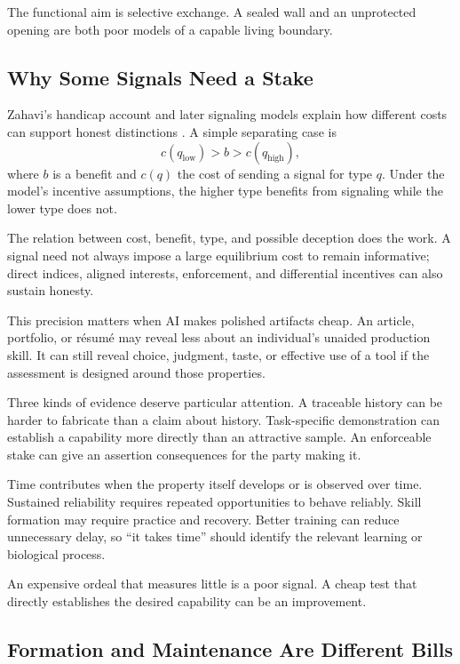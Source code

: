 \documentclass[11pt,openany]{book}
\begin{document}
The functional aim is selective exchange. A sealed wall and an unprotected opening are both poor models of a capable living boundary.

\subsection{Why Some Signals Need a Stake}

Zahavi's handicap account and later signaling models explain how different costs can support honest distinctions \cite{zahavi1975mate,grafen1990biological}. A simple separating case is
\begin{equation}
 c(q_{\mathrm{low}})>b>c(q_{\mathrm{high}}),
\end{equation}
where $b$ is a benefit and $c(q)$ the cost of sending a signal for type $q$. Under the model's incentive assumptions, the higher type benefits from signaling while the lower type does not.

The relation between cost, benefit, type, and possible deception does the work. A signal need not always impose a large equilibrium cost to remain informative; direct indices, aligned interests, enforcement, and differential incentives can also sustain honesty.

This precision matters when AI makes polished artifacts cheap. An article, portfolio, or résumé may reveal less about an individual's unaided production skill. It can still reveal choice, judgment, taste, or effective use of a tool if the assessment is designed around those properties.

Three kinds of evidence deserve particular attention. A traceable history can be harder to fabricate than a claim about history. Task-specific demonstration can establish a capability more directly than an attractive sample. An enforceable stake can give an assertion consequences for the party making it.

Time contributes when the property itself develops or is observed over time. Sustained reliability requires repeated opportunities to behave reliably. Skill formation may require practice and recovery. Better training can reduce unnecessary delay, so “it takes time” should identify the relevant learning or biological process.

An expensive ordeal that measures little is a poor signal. A cheap test that directly establishes the desired capability can be an improvement.

\subsection{Formation and Maintenance Are Different Bills}
\end{document}
